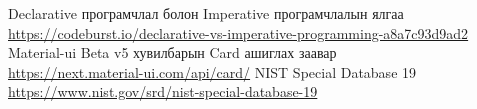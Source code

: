 
\singlespace
{}
\begin{thebibliography}{99}
	Declarative програмчлал болон Imperative програмчлалын ялгаа
	\\\url{https://codeburst.io/declarative-vs-imperative-programming-a8a7c93d9ad2}
	Material-ui Beta v5 хувилбарын Card ашиглах заавар
	\\\url{https://next.material-ui.com/api/card/}
	NIST Special Database 19
	\\\url{https://www.nist.gov/srd/nist-special-database-19}
\end{thebibliography}
